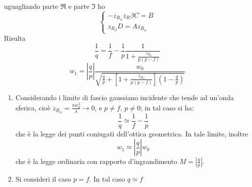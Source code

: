 \documentclass{book}
\def \l {\lambda}
\theoremstyle{remark}
\newtheorem*{oss}{Osservazioni}
\begin{document}
uguagliando parte $\Re$ e parte $\Im$ ho
\begin{equation*}
\begin{cases}
-z_{R_\alpha} z_R{\beta} C = B\\
z_{R_\beta} D = A z_{R_\alpha}
\end{cases}
\end{equation*}
Risulta
\begin{equation*}
\frac{1}{q} = \frac{1}{f} - \frac{1}{p} \frac{1}{1 + \frac{z_{R_\alpha}}{p(p-f)}}
\end{equation*}
\begin{equation*}
w_1 = \left|\frac{q}{p}\right| \frac{w_0}{\sqrt{\frac{q}{p} + \left[ 1 + \frac{z_{R_\alpha}}{p(p-f)}\right] \left(	1 - \frac{q}{p}\right)}}
\end{equation*}
\begin{enumerate}
\item Considerando i limite di fascio gaussiano incidente che tende ad un'onda sferica, cioè $z_{R_\alpha} = \frac{\pi w_0^2}{\l} \rightarrow 0$, e $p \neq f$, $p \neq 0$; in tal caso si ha:
\begin{equation*}
\frac{1}{q} \simeq \frac{1}{f} - \frac{1}{p}
\end{equation*}
che è la legge dei punti coniugati dell'ottica geometrica. In tale limite, inoltre
\begin{equation*}
w_1 \simeq \left|\frac{q}{p}\right| w_0
\end{equation*}
che è la legge ordinaria con rapporto d'ingrandimento $M= \left| \frac{q}{p}\right|$.
\item Si consideri il caso $p = f$. In tal caso $q \simeq f$
\end{enumerate}
\end{document}
